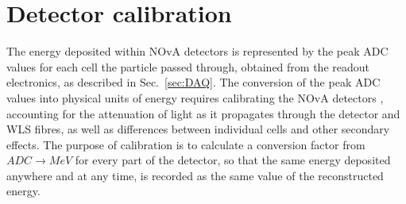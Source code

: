 
\section{Detector calibration}\label{sec:NOvACalibration}
The energy deposited within \gls{NOvA} detectors is represented by the peak \gls{ADC} values for each cell the particle passed through, obtained from the readout electronics, as described in Sec.~\ref{sec:DAQ}.
The conversion of the peak \gls{ADC} values into physical units of energy requires calibrating the \gls{NOvA} detectors \cite{PrabhjotNOvAThesis_CalibrationAndOscResults2019.pdf}, accounting for the attenuation of light as it propagates through the detector and \gls{WLS} fibres, as well as differences between individual cells and other secondary effects. The purpose of calibration is to calculate a conversion factor from $\unit{ADC}\rightarrow\unit{MeV}$ for every part of the detector, so that the same energy deposited anywhere and at any time, is recorded as the same value of the reconstructed energy.


